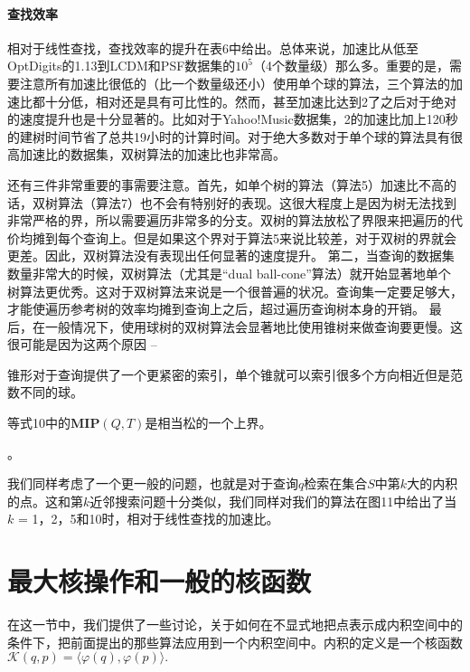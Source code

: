 \documentclass[twocolumn,a4paper]{article}
\begin{document}
\paragraph{查找效率}
相对于线性查找，查找效率的提升在表6中给出。总体来说，加速比从低至OptDigits的1.13到LCDM和PSF数据集的$10^5$（4个数量级）那么多。重要的是，需要注意所有加速比很低的（比一个数量级还小）使用单个球的算法，三个算法的加速比都十分低，相对还是具有可比性的。然而，甚至加速比达到2了之后对于绝对的速度提升也是十分显著的。比如对于Yahoo!Music数据集，2的加速比加上120秒的建树时间节省了总共19小时的计算时间。对于绝大多数对于单个球的算法具有很高加速比的数据集，双树算法的加速比也非常高。

还有三件非常重要的事需要注意。首先，如单个树的算法（算法5）加速比不高的话，双树算法（算法7）也不会有特别好的表现。这很大程度上是因为树无法找到非常严格的界，所以需要遍历非常多的分支。双树的算法放松了界限来把遍历的代价均摊到每个查询上。但是如果这个界对于算法5来说比较差，对于双树的界就会更差。因此，双树算法没有表现出任何显著的速度提升。
第二，当查询的数据集数量非常大的时候，双树算法（尤其是“dual ball-cone”算法）就开始显著地单个树算法更优秀。这对于双树算法来说是一个很普遍的状况。查询集一定要足够大，才能使遍历参考树的效率均摊到查询上之后，超过遍历查询树本身的开销。
最后，在一般情况下，使用球树的双树算法会显著地比使用锥树来做查询要更慢。这很可能是因为这两个原因 --
\begin{enumerate*}[label={\roman*}]
\item 锥形对于查询提供了一个更紧密的索引，单个锥就可以索引很多个方向相近但是范数不同的球。
\item 等式10中的$\mathbf{MIP}(Q,T)$是相当松的一个上界。
\end{enumerate*}。

我们同样考虑了一个更一般的问题，也就是对于查询$q$检索在集合$S$中第$k$大的内积的点。这和第$k$近邻搜索问题十分类似，我们同样对我们的算法在图11中给出了当$k$ = 1，2，5和10时，相对于线性查找的加速比。

\section{最大核操作和一般的核函数}
在这一节中，我们提供了一些讨论，关于如何在不显式地把点表示成内积空间中的条件下，把前面提出的那些算法应用到一个内积空间中。内积的定义是一个核函数$\mathcal{K}(q,p)=\langle \varphi(q),\varphi(p) \rangle.$
\end{document}
